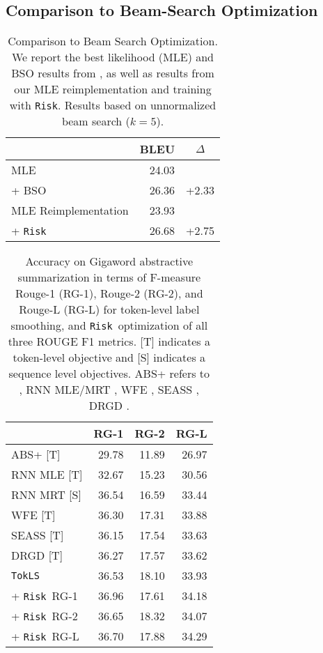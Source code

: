 \documentclass[11pt,a4paper]{article}
\newcommand{\TokLS}{\texttt{TokLS}}
\newcommand{\Risk}{\texttt{Risk}}
\begin{document}
\subsection{Comparison to Beam-Search Optimization}
\label{sec:bso}


\begin{table}[t]
\centering
\begin{tabular}{lrc}
\toprule
& \bf BLEU & $\Delta$ \\ \midrule
MLE & 24.03 & \\
+ BSO & 26.36 & +2.33 \\ 
\midrule
MLE Reimplementation & 23.93 & \\
+ \Risk & 26.68 & +2.75 \\
\bottomrule
\end{tabular}
\caption{Comparison to Beam Search Optimization. We report the best likelihood (MLE) and BSO results from \citet{wiseman2016acl}, as well as results from our MLE reimplementation and training with \Risk.
Results based on unnormalized beam search ($k=5$).
}
\label{tab:bso}
\end{table}


\begin{table}[t]
\centering
\begin{tabular}{lrrr}
\toprule
& \bf RG-1 & \bf RG-2 & \bf RG-L \\ \midrule
ABS+  [T]           & 29.78 & 11.89 & 26.97 \\
RNN MLE [T]    & 32.67 & 15.23 & 30.56 \\
RNN MRT [S]    & 36.54 & 16.59 & 33.44 \\
WFE [T]      & 36.30 & 17.31 & 33.88 \\
SEASS  [T]       & 36.15 & 17.54 & 33.63 \\
DRGD [T]           & 36.27 & 17.57 & 33.62 \\
\midrule
\TokLS                               & 36.53 & 18.10 & 33.93 \\
+ \Risk~RG-1                         & 36.96 & 17.61 & 34.18 \\
+ \Risk~RG-2                         & 36.65 & 18.32 & 34.07 \\
+ \Risk~RG-L                         & 36.70 & 17.88 & 34.29 \\
\bottomrule
\end{tabular}
\caption{Accuracy on Gigaword abstractive summarization in terms of F-measure Rouge-1 (RG-1), Rouge-2 (RG-2), and Rouge-L (RG-L) for token-level label smoothing, and \Risk~optimization of all three ROUGE F1 metrics. [T] indicates a token-level objective and [S] indicates a sequence level objectives. 
ABS+ refers to \citet{rush2015abs}, RNN MLE/MRT \citep{ayana2016neural}, WFE \citep{suzuki2017cutting}, SEASS \citep{zhou2017seass}, DRGD \citep{li2017drgd}.
}
\label{tab:summary}
\end{table}
\end{document}
